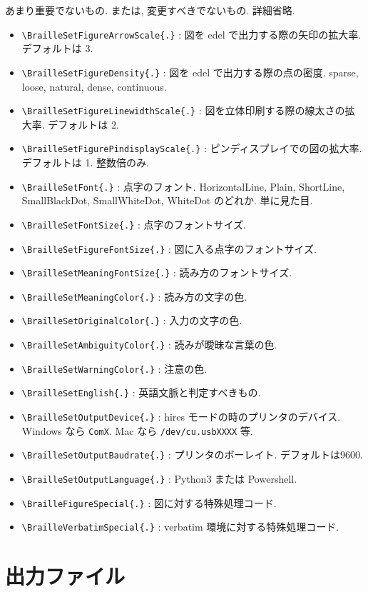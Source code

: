 \documentclass[lualatex,ja=standard,jafont=haranoaji]{bxjsarticle}
\begin{document}
あまり重要でないもの. または, 変更すべきでないもの. 詳細省略.
\begin{itemize}
\item \verb|\BrailleSetFigureArrowScale{.}| : 図を edel で出力する際の矢印の拡大率. デフォルトは 3.
\item \verb|\BrailleSetFigureDensity{.}| : 図を edel で出力する際の点の密度. sparse, loose, natural, dense, continuous.
\item \verb|\BrailleSetFigureLinewidthScale{.}| : 図を立体印刷する際の線太さの拡大率. デフォルトは 2.
\item \verb|\BrailleSetFigurePindisplayScale{.}| : ピンディスプレイでの図の拡大率. デフォルトは 1. 整数倍のみ.
\item \verb|\BrailleSetFont{.}| : 点字のフォント.
HorizontalLine, Plain, ShortLine, SmallBlackDot, SmallWhiteDot, WhiteDot
のどれか. 単に見た目.
\item \verb|\BrailleSetFontSize{.}| : 点字のフォントサイズ.
\item \verb|\BrailleSetFigureFontSize{.}| : 図に入る点字のフォントサイズ.
\item \verb|\BrailleSetMeaningFontSize{.}| : 読み方のフォントサイズ.
\item \verb|\BrailleSetMeaningColor{.}| : 読み方の文字の色.
\item \verb|\BrailleSetOriginalColor{.}| : 入力の文字の色.
\item \verb|\BrailleSetAmbiguityColor{.}| : 読みが曖昧な言葉の色.
\item \verb|\BrailleSetWarningColor{.}| : 注意の色.
\item \verb|\BrailleSetEnglish{.}| : 英語文脈と判定すべきもの.
\item \verb|\BrailleSetOutputDevice{.}| : hires モードの時のプリンタのデバイス. Windows なら \verb|ComX|. Mac なら \verb|/dev/cu.usbXXXX| 等.
\item \verb|\BrailleSetOutputBaudrate{.}| : プリンタのボーレイト. デフォルトは9600.
\item \verb|\BrailleSetOutputLanguage{.}| : Python3 または Powershell.

\item \verb|\BrailleFigureSpecial{.}| : 図に対する特殊処理コード.
\item \verb|\BrailleVerbatimSpecial{.}| : verbatim 環境に対する特殊処理コード.
\end{itemize}

\section{出力ファイル}
\end{document}
